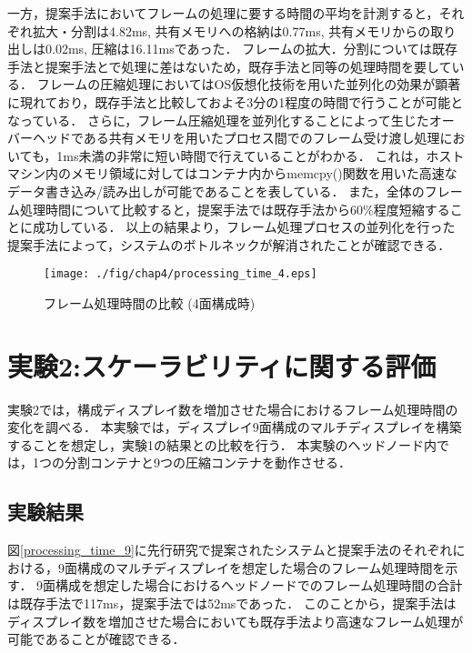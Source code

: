 一方，提案手法においてフレームの処理に要する時間の平均を計測すると，それぞれ拡大・分割は4.82ms, 共有メモリへの格納は0.77ms, 共有メモリからの取り出しは0.02ms, 圧縮は16.11msであった．
フレームの拡大．分割については既存手法と提案手法とで処理に差はないため，既存手法と同等の処理時間を要している．
フレームの圧縮処理においてはOS仮想化技術を用いた並列化の効果が顕著に現れており，既存手法と比較しておよそ3分の1程度の時間で行うことが可能となっている．
さらに，フレーム圧縮処理を並列化することによって生じたオーバーヘッドである共有メモリを用いたプロセス間でのフレーム受け渡し処理においても，1ms未満の非常に短い時間で行えていることがわかる．
これは，ホストマシン内のメモリ領域に対してはコンテナ内からmemcpy()関数を用いた高速なデータ書き込み/読み出しが可能であることを表している．
また，全体のフレーム処理時間について比較すると，提案手法では既存手法から60\%程度短縮することに成功している．
以上の結果より，フレーム処理プロセスの並列化を行った提案手法によって，システムのボトルネックが解消されたことが確認できる．

\begin{figure}[H]
    \hspace*{\fill}
    \texttt{[image: ./fig/chap4/processing\_time\_4.eps]}
    \hspace*{\fill}
    \caption{フレーム処理時間の比較 (4面構成時)}
    \label{processing_time_4}
\end{figure}


\section{実験2:スケーラビリティに関する評価}
実験2では，構成ディスプレイ数を増加させた場合におけるフレーム処理時間の変化を調べる．
本実験では，ディスプレイ9面構成のマルチディスプレイを構築することを想定し，実験1の結果との比較を行う．
本実験のヘッドノード内では，1つの分割コンテナと9つの圧縮コンテナを動作させる．

 \subsection*{実験結果}
 図\ref{processing_time_9}に先行研究で提案されたシステムと提案手法のそれぞれにおける，9面構成のマルチディスプレイを想定した場合のフレーム処理時間を示す．
 9面構成を想定した場合におけるヘッドノードでのフレーム処理時間の合計は既存手法で117ms，提案手法では52msであった．
 このことから，提案手法はディスプレイ数を増加させた場合においても既存手法より高速なフレーム処理が可能であることが確認できる．

